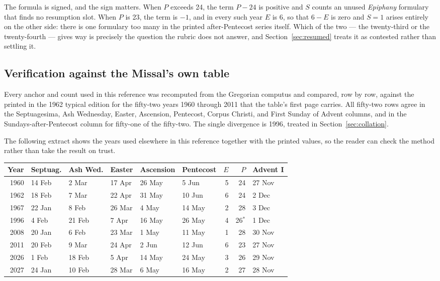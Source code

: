The formula is signed, and the sign matters. When $P$ exceeds 24, the term $P - 24$ is positive
and $S$ counts an unused \emph{Epiphany} formulary that finds no resumption slot. When $P$ is
23, the term is $-1$, and in every such year $E$ is 6, so that $6 - E$ is zero and $S = 1$
arises entirely on the other side: there is one formulary too many in the printed
after-Pentecost series itself. Which of the two — the twenty-third or the twenty-fourth — gives
way is precisely the question the rubric does not answer, and Section~\ref{sec:resumed} treats
it as contested rather than settling it.

\subsection{Verification against the Missal's own table}

Every anchor and count used in this reference was recomputed from the Gregorian computus and
compared, row by row, against the  printed in the
1962 typical edition for the fifty-two years 1960 through 2011 that the table's first page
carries. All fifty-two rows agree in the Septuagesima, Ash Wednesday, Easter, Ascension,
Pentecost, Corpus Christi, and First Sunday of Advent columns, and in the Sundays-after-Pentecost
column for fifty-one of the fifty-two. The single divergence is 1996, treated in
Section~\ref{sec:collation}.

The following extract shows the years used elsewhere in this reference together with the printed
values, so the reader can check the method rather than take the result on trust.

\begin{center}
\small
\renewcommand{\arraystretch}{1.1}
\begin{tabular}{@{}r l l l l l r r l@{}}
\toprule
\textbf{Year} & \textbf{Septuag.} & \textbf{Ash Wed.} & \textbf{Easter} & \textbf{Ascension} & \textbf{Pentecost} & $E$ & $P$ & \textbf{Advent I} \\
\midrule
1960 & 14 Feb & 2 Mar  & 17 Apr & 26 May & 5 Jun  & 5 & 24 & 27 Nov \\
1962 & 18 Feb & 7 Mar  & 22 Apr & 31 May & 10 Jun & 6 & 24 & 2 Dec \\
1967 & 22 Jan & 8 Feb  & 26 Mar & 4 May  & 14 May & 2 & 28 & 3 Dec \\
1996 & 4 Feb  & 21 Feb & 7 Apr  & 16 May & 26 May & 4 & 26$^{\ast}$ & 1 Dec \\
2008 & 20 Jan & 6 Feb  & 23 Mar & 1 May  & 11 May & 1 & 28 & 30 Nov \\
2011 & 20 Feb & 9 Mar  & 24 Apr & 2 Jun  & 12 Jun & 6 & 23 & 27 Nov \\
2026 & 1 Feb  & 18 Feb & 5 Apr  & 14 May & 24 May & 3 & 26 & 29 Nov \\
2027 & 24 Jan & 10 Feb & 28 Mar & 6 May  & 16 May & 2 & 27 & 28 Nov \\
\bottomrule
\end{tabular}
\end{center}

